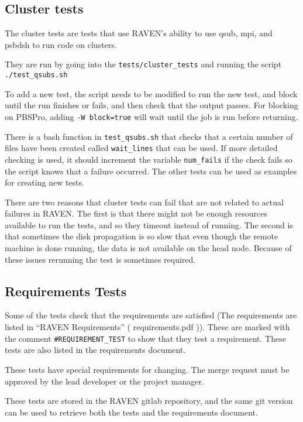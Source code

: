 \documentclass{article}
\begin{document}
\subsection{Cluster tests}


The cluster tests are tests that use RAVEN's ability to use qsub, mpi,
and psbdsh to run code on clusters.

They are run by going into the \verb'tests/cluster_tests' and running
the script \verb'./test_qsubs.sh'

To add a new test, the script needs to be modified to run the new
test, and block until the run finishes or fails, and then check that
the output passes.  For blocking on PBSPro, adding
\verb'-W block=true' will wait until the job is run before returning.

There is a bash function in \verb'test_qsubs.sh' that checks that a
certain number of files have been created called \verb'wait_lines'
that can be used.  If more detailed checking is used, it should
increment the variable \verb'num_fails' if the check fails so the
script knows that a failure occurred.  The other tests can be used as
examples for creating new tests.

There are two reasons that cluster tests can fail that are not related
to actual failures in RAVEN.  The first is that there might not be
enough resources available to run the tests, and so they timeout
instead of running.  The second is that sometimes the disk propagation
is so slow that even though the remote machine is done running, the
data is not available on the head node.  Because of these issues
rerunning the test is sometimes required.

\subsection{Requirements Tests}

Some of the tests check that the requirements are satisfied (The
requirements are listed in ``RAVEN Requirements'' ( requirements.pdf
)).  These are marked with the comment \verb'#REQUIREMENT_TEST' to show
that they test a requirement.  These tests are also listed in the
requirements document.

These tests have special requirements for changing.  The merge request
must be approved by the lead developer or the project manager.

These tests are stored in the RAVEN gitlab repository, and the same
git version can be used to retrieve both the tests and the
requirements document.
\end{document}
